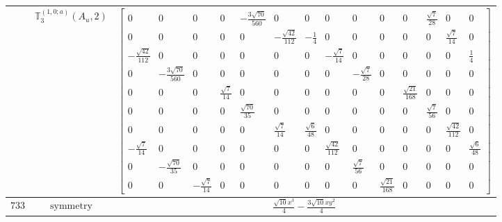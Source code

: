\documentclass[fleqn,8pt,landscape]{jsarticle}
\begin{document}
\begin{longtable}{ccc}
$  $ & $ \mathbb{T}_{3}^{(1,0;a)}(A_{u},2) $ & $ \begin{bmatrix} 0 & 0 & 0 & 0 & - \frac{3 \sqrt{70}}{560} & 0 & 0 & 0 & 0 & 0 & 0 & \frac{\sqrt{7}}{28} & 0 & 0 \\ 0 & 0 & 0 & 0 & 0 & - \frac{\sqrt{42}}{112} & - \frac{1}{4} & 0 & 0 & 0 & 0 & 0 & \frac{\sqrt{7}}{14} & 0 \\ - \frac{\sqrt{42}}{112} & 0 & 0 & 0 & 0 & 0 & 0 & - \frac{\sqrt{7}}{14} & 0 & 0 & 0 & 0 & 0 & \frac{1}{4} \\ 0 & - \frac{3 \sqrt{70}}{560} & 0 & 0 & 0 & 0 & 0 & 0 & - \frac{\sqrt{7}}{28} & 0 & 0 & 0 & 0 & 0 \\ 0 & 0 & 0 & \frac{\sqrt{7}}{14} & 0 & 0 & 0 & 0 & 0 & 0 & \frac{\sqrt{21}}{168} & 0 & 0 & 0 \\ 0 & 0 & 0 & 0 & \frac{\sqrt{70}}{35} & 0 & 0 & 0 & 0 & 0 & 0 & \frac{\sqrt{7}}{56} & 0 & 0 \\ 0 & 0 & 0 & 0 & 0 & \frac{\sqrt{7}}{14} & \frac{\sqrt{6}}{48} & 0 & 0 & 0 & 0 & 0 & \frac{\sqrt{42}}{112} & 0 \\ - \frac{\sqrt{7}}{14} & 0 & 0 & 0 & 0 & 0 & 0 & \frac{\sqrt{42}}{112} & 0 & 0 & 0 & 0 & 0 & \frac{\sqrt{6}}{48} \\ 0 & - \frac{\sqrt{70}}{35} & 0 & 0 & 0 & 0 & 0 & 0 & \frac{\sqrt{7}}{56} & 0 & 0 & 0 & 0 & 0 \\ 0 & 0 & - \frac{\sqrt{7}}{14} & 0 & 0 & 0 & 0 & 0 & 0 & \frac{\sqrt{21}}{168} & 0 & 0 & 0 & 0 \end{bmatrix} $ \\ \hline
$ 733 $ & $ \text{symmetry} $ & $ \frac{\sqrt{10} x^{3}}{4} - \frac{3 \sqrt{10} x y^{2}}{4} $ \\

\end{longtable}
\end{document}
